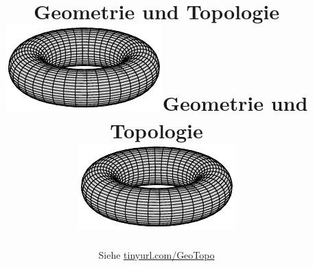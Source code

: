 \begin{titlepage}
    \author{Siehe \href{http://tinyurl.com/GeoTopo}{tinyurl.com/GeoTopo}}
	\ifAFive
    \title{Geometrie und Topologie\\\vspace{4cm}
        \includegraphics[width=0.9\linewidth]{figures/Torus.pdf}}
	\else
    \title{Geometrie und Topologie\\\vspace{10cm}
        \includegraphics[width=0.9\linewidth]{figures/Torus.pdf}}	
	\fi
    \maketitle
\end{titlepage}
